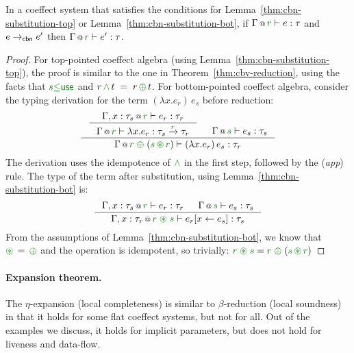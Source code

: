 \begin{theorem}
In a coeffect system that satisfies the conditions for Lemma~\ref{thm:cbn-substitution-top} or
Lemma~\ref{thm:cbn-substitution-bot}, if $\coctx{\Gamma}{\cclrd{r}} \vdash e : \tau$ 
and $e \rightarrow_{\textnormal{\sffamily cbn}} e'$ then $\coctx{\Gamma}{\cclrd{r}} \vdash e' : \tau$.
\end{theorem}
\begin{proof}

For top-pointed coeffect algebra (using Lemma~\ref{thm:cbn-substitution-top}), the proof is similar
to the one in Theorem~\ref{thm:cbv-reduction}, using the facts that $\cclrd{s} \cleq \cunit$
and $r \,\czip\, t \;=\; r \,\cpar\, t$.
For bottom-pointed coeffect algebra, consider the typing derivation for the term
$(\lambda x.e_r)\,e_s$ before reduction:
%
\begin{equation*}
\inference
  { \inference
      {\coctx{\Gamma, x:\tau_s}{\cclrd{r}} \vdash e_r : \tau_r}
      {\coctx{\Gamma}{\cclrd{r}} \vdash \lambda x.e_r : \tau_s \xrightarrow{\cclrd{r}} \tau_r } &
   \coctx{\Gamma}{\cclrd{s}} \vdash e_s : \tau_s }
  {\coctx{\Gamma}{\cclrd{r} \;\cpar\; (\cclrd{s} \,\cseq\, \cclrd{r})} \vdash (\lambda x.e_r)\,e_s : \tau_r }
\end{equation*}
%
The derivation uses the idempotence of $\czip$ in the first step, followed by the 
(\emph{app}) rule. The type of the term after substitution, using Lemma~\ref{thm:cbn-substitution-bot} is:
%
\begin{equation*}
\inference
  { \coctx{\Gamma, x:\tau_s}{\cclrd{r}} \vdash e_r : \tau_r & 
    \coctx{\Gamma}{\cclrd{s}} \vdash e_s : \tau_s }
  { \coctx{\Gamma, x:\tau_r}{\cclrd{r}\;\cseq\;\cclrd{s}} \vdash \subst{e_r}{x}{e_s} : \tau_s }
\end{equation*}
%
From the assumptions of Lemma~\ref{thm:cbn-substitution-bot}, we know that $\cseq\,=\,\cpar$
and the operation is idempotent, so trivially:
$\cclrd{r}\;\cseq\;\cclrd{s} = \cclrd{r} \;\cpar\; (\cclrd{s} \,\cseq\, \cclrd{r})$
\end{proof}

\paragraph{Expansion theorem.}
The $\eta$-expansion (local completeness) is similar to $\beta$-reduction (local soundness) in that
it holds for some flat coeffect systems, but not for all. Out of the examples we discuss, it 
holds for implicit parameters, but does not hold for liveness and data-flow.

